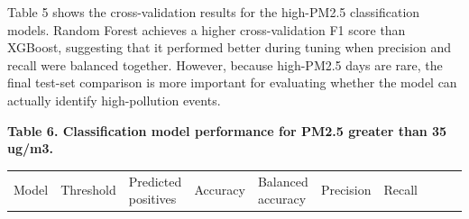 \documentclass[
  letterpaper,
  DIV=11,
  numbers=noendperiod]{scrartcl}
\begin{document}
Table 5 shows the cross-validation results for the high-PM2.5
classification models. Random Forest achieves a higher cross-validation
F1 score than XGBoost, suggesting that it performed better during tuning
when precision and recall were balanced together. However, because
high-PM2.5 days are rare, the final test-set comparison is more
important for evaluating whether the model can actually identify
high-pollution events.

\textbf{Table 6. Classification model performance for PM2.5 greater than
35 ug/m3.}

\begin{longtable}[]{@{}
  >{\raggedright\arraybackslash}p{}
  >{\raggedleft\arraybackslash}p{}
  >{\raggedleft\arraybackslash}p{}
  >{\raggedleft\arraybackslash}p{}
  >{\raggedleft\arraybackslash}p{}
  >{\raggedleft\arraybackslash}p{}
  >{\raggedleft\arraybackslash}p{}
  >{\raggedleft\arraybackslash}p{}
  >{\raggedleft\arraybackslash}p{}
  >{\raggedleft\arraybackslash}p{}@{}}
\toprule\noalign{}
\begin{minipage}[b]{\linewidth}\raggedright
Model
\end{minipage} & \begin{minipage}[b]{\linewidth}\raggedleft
Threshold
\end{minipage} & \begin{minipage}[b]{\linewidth}\raggedleft
Predicted positives
\end{minipage} & \begin{minipage}[b]{\linewidth}\raggedleft
Accuracy
\end{minipage} & \begin{minipage}[b]{\linewidth}\raggedleft
Balanced accuracy
\end{minipage} & \begin{minipage}[b]{\linewidth}\raggedleft
Precision
\end{minipage} & \begin{minipage}[b]{\linewidth}\raggedleft
Recall
\end{minipage} & \begin{minipage}[b]{\linewidth}\raggedleft

\end{minipage}
\end{longtable}
\end{document}
